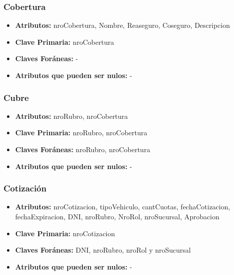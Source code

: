 \documentclass[a4paper,11pt]{article}
\begin{document}
\subsubsection{Cobertura}

\begin{itemize}

	\item \textbf{Atributos:} nroCobertura, Nombre, Reaseguro, Coseguro, Descripcion

	\item \textbf{Clave Primaria:} nroCobertura
	
	\item \textbf{Claves Foráneas:} -

	\item \textbf{Atributos que pueden ser nulos:} -
	
\end{itemize}

\subsubsection{Cubre}

\begin{itemize}

	\item \textbf{Atributos:} nroRubro, nroCobertura

	\item \textbf{Clave Primaria:} nroRubro, nroCobertura
	
	\item \textbf{Claves Foráneas:} nroRubro, nroCobertura

	\item \textbf{Atributos que pueden ser nulos:} -
	
\end{itemize}


\subsubsection{Cotización}

\begin{itemize}

	\item \textbf{Atributos:} nroCotizacion, tipoVehiculo, cantCuotas, fechaCotizacion, fechaExpiracion, DNI, nroRubro, NroRol, nroSucursal, Aprobacion
	
	\item \textbf{Clave Primaria:} nroCotizacion
	
	\item \textbf{Claves Foráneas:} DNI, nroRubro, nroRol y nroSucursal

	\item \textbf{Atributos que pueden ser nulos:} -
	
\end{itemize}
\end{document}
